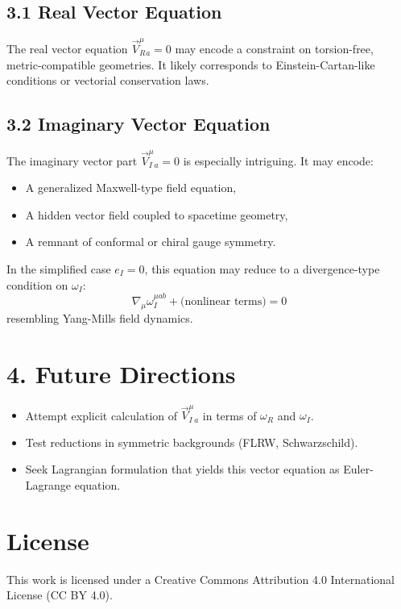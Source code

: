 \documentclass[12pt]{article}
\begin{document}
\subsection*{3.1 Real Vector Equation}

The real vector equation $\vec{V}_R^\mu_a = 0$ may encode a constraint on torsion-free, metric-compatible geometries. It likely corresponds to Einstein-Cartan-like conditions or vectorial conservation laws.

\subsection*{3.2 Imaginary Vector Equation}

The imaginary vector part $\vec{V}_I^\mu_a = 0$ is especially intriguing. It may encode:
\begin{itemize}
  \item A generalized Maxwell-type field equation,
  \item A hidden vector field coupled to spacetime geometry,
  \item A remnant of conformal or chiral gauge symmetry.
\end{itemize}

In the simplified case $e_I = 0$, this equation may reduce to a divergence-type condition on $\omega_I$:
\[
\nabla_\mu \omega_I^{\mu ab} + \text{(nonlinear terms)} = 0
\]
resembling Yang-Mills field dynamics.

\section*{4. Future Directions}

\begin{itemize}
  \item Attempt explicit calculation of $\vec{V}_I^\mu_a$ in terms of $\omega_R$ and $\omega_I$.
  \item Test reductions in symmetric backgrounds (FLRW, Schwarzschild).
  \item Seek Lagrangian formulation that yields this vector equation as Euler-Lagrange equation.
\end{itemize}


\section*{License}
This work is licensed under a Creative Commons Attribution 4.0 International License (CC BY 4.0).
\end{document}
